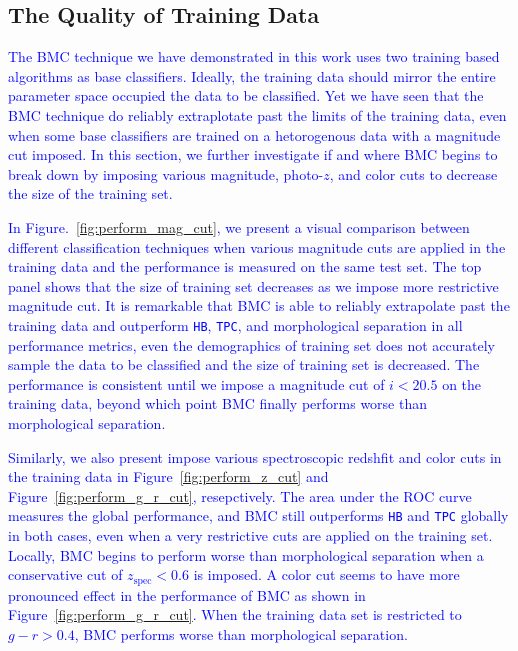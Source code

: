 \documentclass[useAMS,usenatbib]{mn2e}
\begin{document}
\subsection{The Quality of Training Data}
  \label{section:quality_training}

\textcolor{blue}{The BMC technique we have demonstrated in this work uses
two training based algorithms as base classifiers.
Ideally, the training data should mirror the entire parameter space
occupied the data to be classified.
Yet we have seen that the BMC technique do reliably
extraplotate past the limits of the training data,
even when some base classifiers are trained on a hetorogenous data
with a magnitude cut imposed.
In this section, we further investigate
if and where BMC begins to break down
by imposing various magnitude, photo-$z$, and color cuts
to decrease the size of the training set.}

\textcolor{blue}{In Figure.~\ref{fig:perform_mag_cut}, we present
a visual comparison between different classification techniques
when various magnitude cuts are applied in the training data
and the performance is measured on the same test set.
The top panel shows that the size of training set
decreases as we impose more restrictive magnitude cut.
It is remarkable that BMC is able to reliably extrapolate
past the training data and outperform \texttt{HB}, \texttt{TPC},
and morphological separation in all performance metrics,
even the demographics of training set does not accurately sample 
the data to be classified and the size of training set is decreased.
The performance is consistent until we impose a magnitude cut
of $i < 20.5$ on the training data,
beyond which point BMC finally performs worse than morphological separation.}

\textcolor{blue}{Similarly, we also present impose various
spectroscopic redshfit and color cuts in the training data
in Figure~\ref{fig:perform_z_cut} and Figure~\ref{fig:perform_g_r_cut},
resepctively.
The area under the ROC curve measures the global performance,
and BMC still outperforms \texttt{HB} and \texttt{TPC} globally in both cases,
even when a very restrictive cuts are applied on the training set.
Locally, BMC begins to perform worse than morphological separation
when a conservative cut of $z_{\mathrm{spec}} < 0.6$ is imposed.
A color cut seems to have more pronounced effect in the performance of BMC
as shown in Figure~\ref{fig:perform_g_r_cut}.
When the training data set is restricted to $g - r > 0.4$,
BMC performs worse than morphological separation.}
\end{document}
